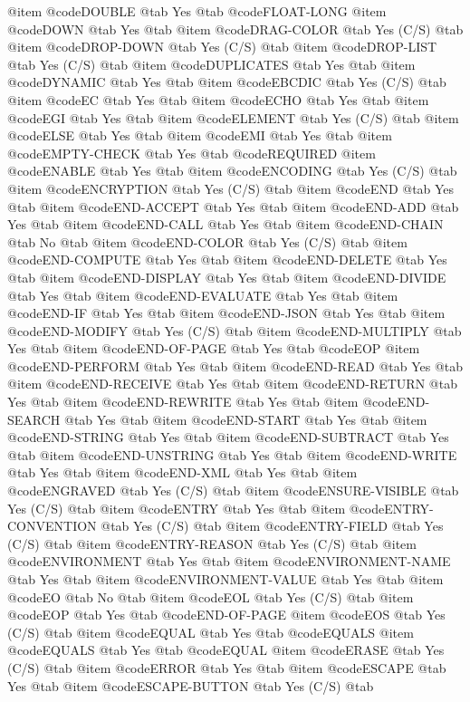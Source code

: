 @item @code{DOUBLE} @tab Yes @tab @code{FLOAT-LONG}
@item @code{DOWN} @tab Yes @tab 
@item @code{DRAG-COLOR} @tab Yes	(C/S) @tab 
@item @code{DROP-DOWN} @tab Yes	(C/S) @tab 
@item @code{DROP-LIST} @tab Yes	(C/S) @tab 
@item @code{DUPLICATES} @tab Yes @tab 
@item @code{DYNAMIC} @tab Yes @tab 
@item @code{EBCDIC} @tab Yes	(C/S) @tab 
@item @code{EC} @tab Yes @tab 
@item @code{ECHO} @tab Yes @tab 
@item @code{EGI} @tab Yes @tab 
@item @code{ELEMENT} @tab Yes	(C/S) @tab 
@item @code{ELSE} @tab Yes @tab 
@item @code{EMI} @tab Yes @tab 
@item @code{EMPTY-CHECK} @tab Yes @tab @code{REQUIRED}
@item @code{ENABLE} @tab Yes @tab 
@item @code{ENCODING} @tab Yes	(C/S) @tab 
@item @code{ENCRYPTION} @tab Yes	(C/S) @tab 
@item @code{END} @tab Yes @tab 
@item @code{END-ACCEPT} @tab Yes @tab 
@item @code{END-ADD} @tab Yes @tab 
@item @code{END-CALL} @tab Yes @tab 
@item @code{END-CHAIN} @tab No @tab 
@item @code{END-COLOR} @tab Yes	(C/S) @tab 
@item @code{END-COMPUTE} @tab Yes @tab 
@item @code{END-DELETE} @tab Yes @tab 
@item @code{END-DISPLAY} @tab Yes @tab 
@item @code{END-DIVIDE} @tab Yes @tab 
@item @code{END-EVALUATE} @tab Yes @tab 
@item @code{END-IF} @tab Yes @tab 
@item @code{END-JSON} @tab Yes @tab 
@item @code{END-MODIFY} @tab Yes	(C/S) @tab 
@item @code{END-MULTIPLY} @tab Yes @tab 
@item @code{END-OF-PAGE} @tab Yes @tab @code{EOP}
@item @code{END-PERFORM} @tab Yes @tab 
@item @code{END-READ} @tab Yes @tab 
@item @code{END-RECEIVE} @tab Yes @tab 
@item @code{END-RETURN} @tab Yes @tab 
@item @code{END-REWRITE} @tab Yes @tab 
@item @code{END-SEARCH} @tab Yes @tab 
@item @code{END-START} @tab Yes @tab 
@item @code{END-STRING} @tab Yes @tab 
@item @code{END-SUBTRACT} @tab Yes @tab 
@item @code{END-UNSTRING} @tab Yes @tab 
@item @code{END-WRITE} @tab Yes @tab 
@item @code{END-XML} @tab Yes @tab 
@item @code{ENGRAVED} @tab Yes	(C/S) @tab 
@item @code{ENSURE-VISIBLE} @tab Yes	(C/S) @tab 
@item @code{ENTRY} @tab Yes @tab 
@item @code{ENTRY-CONVENTION} @tab Yes	(C/S) @tab 
@item @code{ENTRY-FIELD} @tab Yes	(C/S) @tab 
@item @code{ENTRY-REASON} @tab Yes	(C/S) @tab 
@item @code{ENVIRONMENT} @tab Yes @tab 
@item @code{ENVIRONMENT-NAME} @tab Yes @tab 
@item @code{ENVIRONMENT-VALUE} @tab Yes @tab 
@item @code{EO} @tab No @tab 
@item @code{EOL} @tab Yes	(C/S) @tab 
@item @code{EOP} @tab Yes @tab @code{END-OF-PAGE}
@item @code{EOS} @tab Yes	(C/S) @tab 
@item @code{EQUAL} @tab Yes @tab @code{EQUALS}
@item @code{EQUALS} @tab Yes @tab @code{EQUAL}
@item @code{ERASE} @tab Yes	(C/S) @tab 
@item @code{ERROR} @tab Yes @tab 
@item @code{ESCAPE} @tab Yes @tab 
@item @code{ESCAPE-BUTTON} @tab Yes	(C/S) @tab 
